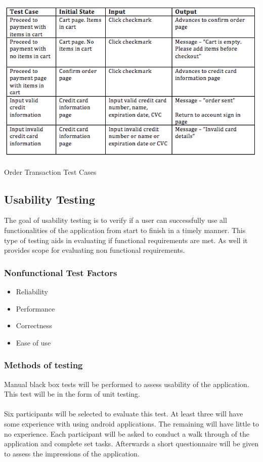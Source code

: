 \documentclass[12pt]{article}
\begin{document}
\begin{table}[h]
\includegraphics[width=\textwidth,height=\textheight,keepaspectratio]{orderTransactionTC.png}
  \caption{Order Transaction Test Cases}
\end{table}
\subsection{Usability Testing}
The goal of usability testing is to verify if a user can successfully use all functionalities of the application from start to finish in a timely manner. This type of testing aids in evaluating if functional requirements are met. As well it provides scope for evaluating non functional requirements.
\subsubsection{Nonfunctional Test Factors}
\begin{itemize}
  \item Reliability 
  \item Performance
  \item 	Correctness
  \item 	Ease of use
\end{itemize}

\subsubsection{Methods of testing}

Manual black box tests will be performed to assess usability of the application. This test will be in the form of unit testing. 
\\\\
Six participants will be selected to evaluate this test. At least three will have some experience with using android applications. The remaining will have little to no experience. Each participant will be asked to conduct a walk through of the application and complete set tasks. Afterwards a short questionnaire will be given to assess the impressions of the application.  
\end{document}
